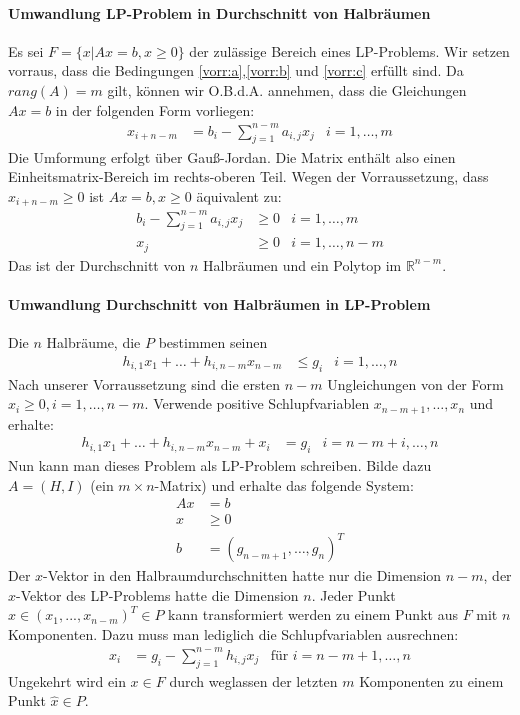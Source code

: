 \paragraph*{Umwandlung LP-Problem in Durchschnitt von Halbräumen}
Es sei $F = \{ x | Ax = b , x \geq 0 \}$ der zulässige Bereich eines LP-Problems. Wir setzen vorraus, dass die Bedingungen \ref{vorr:a},\ref{vorr:b} und \ref{vorr:c} erfüllt sind. Da $rang(A) = m$ gilt, können wir O.B.d.A. annehmen, dass die Gleichungen $Ax=b$ in der folgenden Form vorliegen:
\begin{align}
x_{i+n-m} &= b_i - \sum_{j=1}^{n-m} a_{i,j}x_j & i = 1,\dotsc,m
\end{align}
Die Umformung erfolgt über Gauß-Jordan. Die Matrix enthält also einen Einheitsmatrix-Bereich im rechts-oberen Teil. Wegen der Vorraussetzung, dass $x_{i+n-m} \geq 0$ ist $Ax=b, x \geq 0$ äquivalent zu:
\begin{align}
 b_i - \sum_{j=1}^{n-m} a_{i,j}x_j &\geq 0 & i = 1,\dotsc,m\\
 x_j &\geq 0 & i = 1,\dotsc,n-m
\end{align}
Das ist der Durchschnitt von $n$ Halbräumen und ein Polytop im $\mathbb R^{n-m}$.
\paragraph*{Umwandlung  Durchschnitt von Halbräumen in LP-Problem}
Die $n$ Halbräume, die $P$ bestimmen seinen
\begin{align*}
h_{i,1} x_1 + \dotsc + h_{i,n-m} x_{n-m} &\leq g_i & i = 1,\dotsc,n
\end{align*}
Nach unserer Vorraussetzung sind die ersten $n-m$ Ungleichungen von der Form $x_i \geq 0, i = 1,\dotsc,n-m$.
Verwende positive Schlupfvariablen $x_{n-m+1}, \dotsc , x_n$ und erhalte:
\begin{align*}
h_{i,1} x_1 + \dotsc + h_{i,n-m} x_{n-m} + x_i &= g_i & i = n-m+i,\dotsc,n
\end{align*}
Nun kann man dieses Problem als LP-Problem schreiben. Bilde dazu $A = ( H, I )$ (ein $m\times n$-Matrix) und erhalte das folgende System:
\begin{align*}
Ax &= b\\
x &\geq 0\\
b &= (g_{n-m+1},\dotsc,g_n)^T
\end{align*}
Der $x$-Vektor in den Halbraumdurchschnitten hatte nur die Dimension $n-m$, der $x$-Vektor des LP-Problems hatte die Dimension $n$. 
Jeder Punkt $\hat{x} \in (x_1,...,x_{n-m})^T \in P$ kann transformiert werden zu einem Punkt aus $F$ mit $n$ Komponenten. Dazu muss man lediglich die Schlupfvariablen ausrechnen:
\begin{align*}
x_i &= g_i - \sum_{j=1}^{n-m} h_{i,j}x_j & \text{für $i=n-m+1,\dotsc,n$}
\end{align*}
Ungekehrt wird ein $x\in F$ durch weglassen der letzten $m$ Komponenten zu einem Punkt $\hat{x} \in P$.


